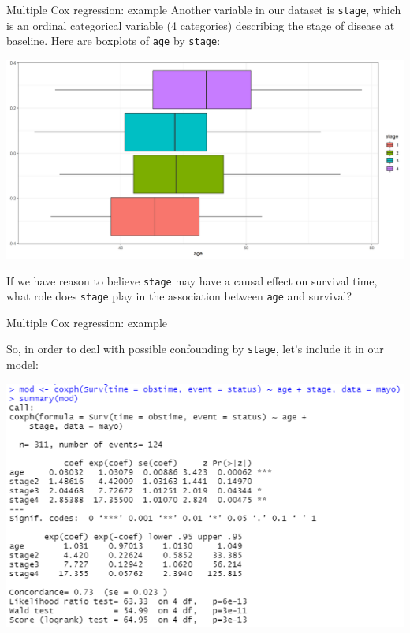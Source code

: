 \documentclass[10pt,t]{beamer}
\begin{document}
\begin{frame}{Multiple Cox regression: example}
	\vspace{-0.6cm}
	Another variable in our dataset is \texttt{stage}, which is an ordinal categorical variable (4 categories) describing the stage of disease at baseline. Here are boxplots of \texttt{age} by \texttt{stage}: 
	\begin{center}
		\includegraphics[width = \textwidth]{figs/stage_by_age_box.png}
	\end{center}
	If we have reason to believe \texttt{stage} may have a causal effect on survival time, what role does \texttt{stage} play in the association between \texttt{age} and survival?
\end{frame}

\begin{frame}{Multiple Cox regression: example}
	\vspace{-5 mm}
	
	So, in order to deal with possible confounding by \texttt{stage}, let's include it in our model:
	
	\medskip
	
		\begin{center}
		\includegraphics[width = \textwidth]{figs/multiple_cox_regression_code.png}
	\end{center}
\end{frame}
\end{document}
